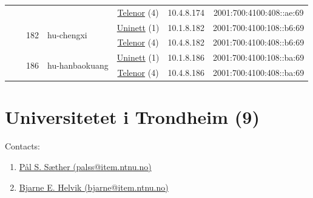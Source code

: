 \begin{small}
\begin{center}
\begin{longtable}{|c|c|c|c|c|c|c|c|}
  &  &  &  & \multicolumn{2}{|c|}{\tiny{\href{https://www.telenor.no}{Telenor} (4)}} & \tiny{10.4.8.174} & \tiny{2001:700:4100:408::ae:69} \\* \cline{3-3}\cline{4-4}\cline{5-5}\cline{6-6}\cline{7-7}\cline{8-8}
  &  & \multirow{2}{*}{\tiny{182}} & \multicolumn{1}{|l|}{\multirow{2}{*}{\tiny{hu-chengxi}}} & \multicolumn{2}{|c|}{\tiny{\href{https://www.uninett.no}{Uninett} (1)}} & \tiny{10.1.8.182} & \tiny{2001:700:4100:108::b6:69} \\* \cline{5-5}\cline{6-6}\cline{7-7}\cline{8-8}
  &  &  &  & \multicolumn{2}{|c|}{\tiny{\href{https://www.telenor.no}{Telenor} (4)}} & \tiny{10.4.8.182} & \tiny{2001:700:4100:408::b6:69} \\* \cline{3-3}\cline{4-4}\cline{5-5}\cline{6-6}\cline{7-7}\cline{8-8}
  &  & \multirow{2}{*}{\tiny{186}} & \multicolumn{1}{|l|}{\multirow{2}{*}{\tiny{hu-hanbaokuang}}} & \multicolumn{2}{|c|}{\tiny{\href{https://www.uninett.no}{Uninett} (1)}} & \tiny{10.1.8.186} & \tiny{2001:700:4100:108::ba:69} \\* \cline{5-5}\cline{6-6}\cline{7-7}\cline{8-8}
  &  &  &  & \multicolumn{2}{|c|}{\tiny{\href{https://www.telenor.no}{Telenor} (4)}} & \tiny{10.4.8.186} & \tiny{2001:700:4100:408::ba:69} \\ \hline
\end{longtable}
\end{center}
\end{small}



\section{Universitetet i Trondheim (9)}
\label{sec:NTNU}

Contacts:\begin{enumerate}
 \item {}\href{mailto:palss@item.ntnu.no}{Pål S. Sæther (palss@item.ntnu.no)}
 \item {}\href{mailto:bjarne@item.ntnu.no}{Bjarne E. Helvik (bjarne@item.ntnu.no)}
\end{enumerate}

